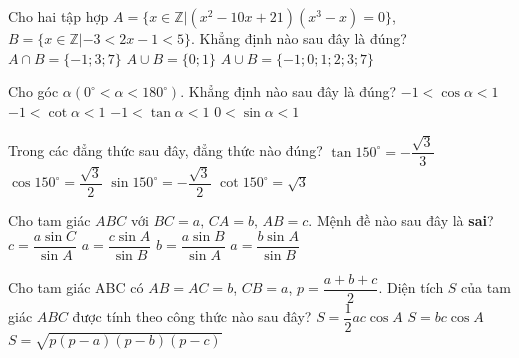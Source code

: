 \begin{ex}%
	Cho hai tập hợp $A = \{x \in \mathbb{Z} | (x^2 - 10x + 21)(x^3 - x) = 0\}$, $B = \{x \in \mathbb{Z} | -3 < 2x - 1 < 5\}$. Khẳng định nào sau đây là đúng?
	{$A \cap B = \{-1; 3; 7\}$}
	{$A \cup B = \{0; 1\}$}
	{\True $A \cup B = \{-1; 0; 1; 2; 3; 7\}$}
\end{ex}

\begin{ex}%
	Cho góc $\alpha\left(0^\circ<\alpha<180^\circ\right)$. Khẳng định nào sau đây là đúng?
	\choice
	{\True $-1<\cos \alpha<1$}
	{$-1<\cot \alpha<1$}
	{$-1<\tan \alpha<1$}
	{$0<\sin \alpha<1$}
\end{ex}

\begin{ex}%
	Trong các đẳng thức sau đây, đẳng thức nào đúng?
	\choice
	{\True $\tan 150^\circ=-\dfrac{\sqrt{3}}{3}$}
	{$\cos 150^\circ=\dfrac{\sqrt{3}}{2}$}
	{$\sin 150^\circ=-\dfrac{\sqrt{3}}{2}$}
	{$\cot 150^\circ=\sqrt{3}$}
\end{ex}

\begin{ex}%
	Cho tam giác $ABC$ với $BC=a,\,CA=b,\,AB=c.$ Mệnh đề nào sau đây là \textbf{sai}?
	\choice
	{$c=\dfrac{a\sin C}{\sin A}$}
	{\True $a=\dfrac{c\sin A}{\sin B}$}
	{$b=\dfrac{a\sin B}{\sin A}$}
	{$a=\dfrac{b\sin A}{\sin B}$}
\end{ex}

\begin{ex}%
	Cho tam giác ABC có $AB = AC = b$, $CB = a$, $p = \dfrac{a+b+c}{2}$. Diện tích $S$ của tam giác $ABC$ được tính theo công thức nào sau đây?
	{$S = \dfrac{1}{2}ac \cos A$}
	{$S = bc \cos A$}
	{\True $S = \sqrt{p(p-a)(p-b)(p-c)}$}
\end{ex}


